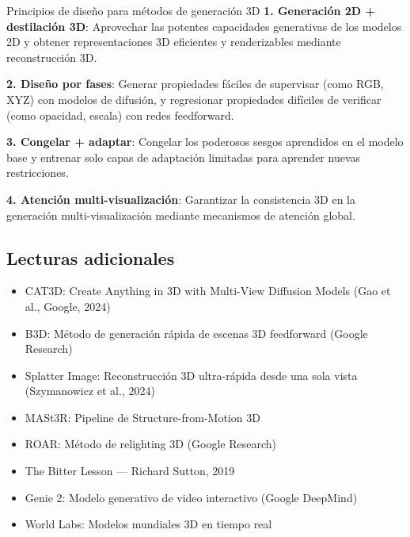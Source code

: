 \begin{importantbox}{Principios de diseño para métodos de generación 3D}
\textbf{1. Generación 2D + destilación 3D}: Aprovechar las potentes capacidades generativas de los modelos 2D y obtener representaciones 3D eficientes y renderizables mediante reconstrucción 3D.

\textbf{2. Diseño por fases}: Generar propiedades fáciles de supervisar (como RGB, XYZ) con modelos de difusión, y regresionar propiedades difíciles de verificar (como opacidad, escala) con redes feedforward.

\textbf{3. Congelar + adaptar}: Congelar los poderosos sesgos aprendidos en el modelo base y entrenar solo capas de adaptación limitadas para aprender nuevas restricciones.

\textbf{4. Atención multi-visualización}: Garantizar la consistencia 3D en la generación multi-visualización mediante mecanismos de atención global.
\end{importantbox}

\subsection{Lecturas adicionales}

\begin{itemize}
    \item CAT3D: Create Anything in 3D with Multi-View Diffusion Models (Gao et al., Google, 2024)
    \item B3D: Método de generación rápida de escenas 3D feedforward (Google Research)
    \item Splatter Image: Reconstrucción 3D ultra-rápida desde una sola vista (Szymanowicz et al., 2024)
    \item MASt3R: Pipeline de Structure-from-Motion 3D
    \item ROAR: Método de relighting 3D (Google Research)
    \item The Bitter Lesson --- Richard Sutton, 2019
    \item Genie 2: Modelo generativo de video interactivo (Google DeepMind)
    \item World Labs: Modelos mundiales 3D en tiempo real
\end{itemize}



